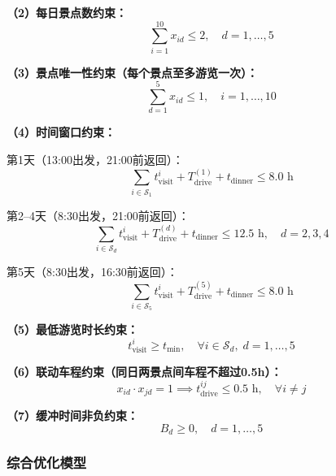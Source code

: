 \documentclass[12pt,a4paper]{ctexart}
\begin{document}
\textbf{（2）每日景点数约束：}
\begin{equation}
\label{con:daily}
\sum_{i=1}^{10} x_{id} \le 2, \quad d=1,\ldots,5
\end{equation}

\textbf{（3）景点唯一性约束（每个景点至多游览一次）：}
\begin{equation}
\label{con:unique}
\sum_{d=1}^{5} x_{id} \le 1, \quad i=1,\ldots,10
\end{equation}

\textbf{（4）时间窗口约束：}

第1天（13:00出发，21:00前返回）：
\begin{equation}
\label{con:time1}
\sum_{i \in \mathcal{S}_1} t_{\text{visit}}^i + T_{\text{drive}}^{(1)} + t_{\text{dinner}} \le 8.0 \text{ h}
\end{equation}

第2--4天（8:30出发，21:00前返回）：
\begin{equation}
\label{con:time24}
\sum_{i \in \mathcal{S}_d} t_{\text{visit}}^i + T_{\text{drive}}^{(d)} + t_{\text{dinner}} \le 12.5 \text{ h}, \quad d=2,3,4
\end{equation}

第5天（8:30出发，16:30前返回）：
\begin{equation}
\label{con:time5}
\sum_{i \in \mathcal{S}_5} t_{\text{visit}}^i + T_{\text{drive}}^{(5)} + t_{\text{dinner}} \le 8.0 \text{ h}
\end{equation}

\textbf{（5）最低游览时长约束：}
\begin{equation}
\label{con:tmin}
t_{\text{visit}}^i \ge t_{\min}, \quad \forall i \in \mathcal{S}_d, \; d=1,\ldots,5
\end{equation}

\textbf{（6）联动车程约束（同日两景点间车程不超过0.5h）：}
\begin{equation}
\label{con:link}
x_{id} \cdot x_{jd} = 1 \implies t_{\text{drive}}^{ij} \le 0.5 \text{ h}, \quad \forall i \ne j
\end{equation}

\textbf{（7）缓冲时间非负约束：}
\begin{equation}
\label{con:buffer}
B_d \ge 0, \quad d=1,\ldots,5
\end{equation}

\subsubsection{综合优化模型}
\end{document}
